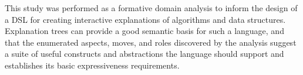 \documentclass[sigconf]{acmart}
\begin{document}
This study was performed as a formative domain analysis to inform the design of
a DSL for creating interactive explanations of algorithms and data structures.
Explanation trees can provide a good semantic basis for such a language, and
that the enumerated aspects, moves, and roles discovered by the analysis
suggest a suite of useful constructs and abstractions the language should
support and establishes its basic expressiveness requirements.




\end{document}
